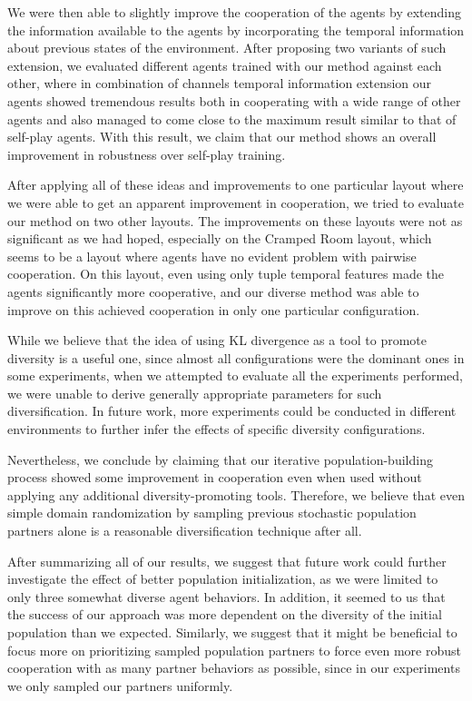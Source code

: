 We were then able to slightly improve the cooperation of the agents by extending the information available to the agents by incorporating the temporal information about previous states of the environment.
After proposing two variants of such extension, we evaluated different agents trained with our method against each other, where in combination of channels temporal information extension our agents showed tremendous results both in cooperating with a wide range of other agents and also managed to come close to the maximum result similar to that of self-play agents.
With this result, we claim that our method shows an overall improvement in robustness over self-play training.

After applying all of these ideas and improvements to one particular layout where we were able to get an apparent improvement in cooperation, we tried to evaluate our method on two other layouts.
The improvements on these layouts were not as significant as we had hoped, especially on the Cramped Room layout, which seems to be a layout where agents have no evident problem with pairwise cooperation.
On this layout, even using only tuple temporal features made the agents significantly more cooperative, and our diverse method was able to improve on this achieved cooperation in only one particular configuration.

While we believe that the idea of using KL divergence as a tool to promote diversity is a useful one, since almost all configurations were the dominant ones in some experiments, when we attempted to evaluate all the experiments performed, we were unable to derive generally appropriate parameters for such diversification.
In future work, more experiments could be conducted in different environments to further infer the effects of specific diversity configurations.

Nevertheless, we conclude by claiming that our iterative population-building process showed some improvement in cooperation even when used without applying any additional diversity-promoting tools.
Therefore, we believe that even simple domain randomization by sampling previous stochastic population partners alone is a reasonable diversification technique after all.

After summarizing all of our results, we suggest that future work could further investigate the effect of better population initialization, as we were limited to only three somewhat diverse agent behaviors.
In addition, it seemed to us that the success of our approach was more dependent on the diversity of the initial population than we expected.
Similarly, we suggest that it might be beneficial to focus more on prioritizing sampled population partners to force even more robust cooperation with as many partner behaviors as possible, since in our experiments we only sampled our partners uniformly.


